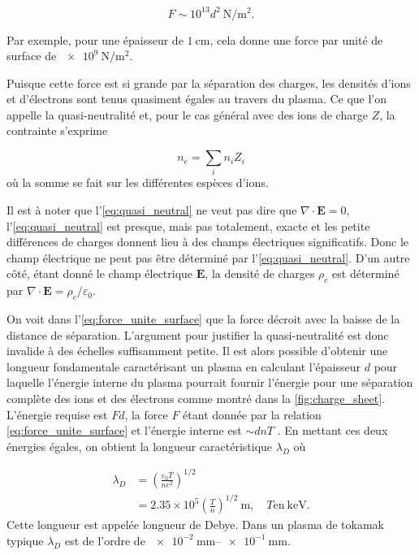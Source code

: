 \documentclass[main.tex]{subfiles}
\begin{document}
\[
	F \sim 10^{13} d^2 \SI{}{\newton\per\meter\squared}.
\]

\noindent Par exemple, pour une épaisseur de \( \SI{1}{\centi\meter} \), cela donne une force par unité de surface de \( \SI{e9}{\newton\per\meter\squared} \).

Puisque cette force est si grande par la séparation des charges, les densités d'ions et d'électrons sont tenus quasiment égales au travers du plasma. Ce que l'on appelle la quasi-neutralité et, pour le cas général avec des ions de charge \( Z \), la contrainte s'exprime

\begin{equation}
	n_e = \sum_i n_i Z_i
	\label{eq:quasi_neutral}
\end{equation}
où la somme se fait sur les différentes espèces d'ions.

Il est à noter que l'\autoref{eq:quasi_neutral} ne veut pas dire que \( \nabla \cdot \bm{E} = 0 \), l'\autoref{eq:quasi_neutral} est presque, mais pas totalement, exacte et les petite différences de charges donnent lieu à des champs électriques significatifs.
Donc le champ électrique ne peut pas être déterminé par l'\autoref{eq:quasi_neutral}.
D'un autre côté, étant donné le champ électrique \( \bm{E} \), la densité de charges \( \rho_c \) est déterminé par \( \nabla \cdot \bm{E} = \rho_c/\varepsilon_0 \).

On voit dans l'\autoref{eq:force_unite_surface} que la force décroit avec la baisse de la distance de séparation.
L'argument pour justifier la quasi-neutralité est donc invalide à des échelles suffisamment petite.
Il est alors possible d'obtenir une longueur fondamentale caractérisant un plasma en calculant l'épaisseur \( d \) pour laquelle l'énergie interne du plasma pourrait fournir l'énergie pour une séparation complète des ions et des électrons comme montré dans la \autoref{fig:charge_sheet}.
L'énergie requise est \( F d \), la force \( F \) étant donnée par la relation \ref{eq:force_unite_surface} et l'énergie interne est \( \sim dn T \) . En mettant ces deux énergies égales, on obtient la longueur caractéristique \( \lambda_D \) où

\begin{align}
	\lambda_D &= \left( \frac{\varepsilon_0 T}{n e^2} \right)^{1/2} \nonumber \\
	&= 2.35 \times 10^5 \left( \frac{T}{n} \right)^{1/2} \SI{}{\meter}, \quad T \text{en} \SI{}{\kilo\electronvolt}.
	\label{eq:longueur_debye}
\end{align}
Cette longueur est appelée longueur de Debye.
Dans un plasma de tokamak typique \( \lambda_D \) est de l'ordre de \( \qtyrange[range-units=single,range-phrase=-]{e-2}{e-1}{\milli\meter}  \).
\end{document}
